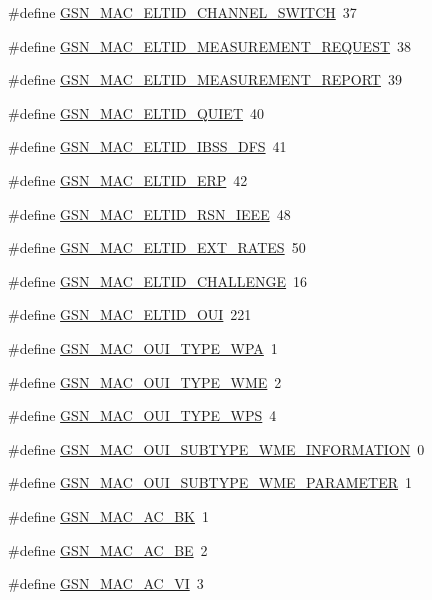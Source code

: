 \begin{DoxyCompactItemize}
\item 
\#define \hyperlink{a00523_aa9647b9b328ea5d3648960becda5d548}{GSN\_\-MAC\_\-ELTID\_\-CHANNEL\_\-SWITCH}~37
\item 
\#define \hyperlink{a00523_a74206ded393143ed4a945c22124274c4}{GSN\_\-MAC\_\-ELTID\_\-MEASUREMENT\_\-REQUEST}~38
\item 
\#define \hyperlink{a00523_a8b1f0cce85abeddecd5a4789a7be5877}{GSN\_\-MAC\_\-ELTID\_\-MEASUREMENT\_\-REPORT}~39
\item 
\#define \hyperlink{a00523_ab483b87fc0080afaa038193e398c22eb}{GSN\_\-MAC\_\-ELTID\_\-QUIET}~40
\item 
\#define \hyperlink{a00523_a4d517bf86f17132796f81d534812dfc3}{GSN\_\-MAC\_\-ELTID\_\-IBSS\_\-DFS}~41
\item 
\#define \hyperlink{a00523_a3f4d39075c8372bd6e0f5cd0071b1f5d}{GSN\_\-MAC\_\-ELTID\_\-ERP}~42
\item 
\#define \hyperlink{a00523_ae13688c49759c46706b5d2c131a7337d}{GSN\_\-MAC\_\-ELTID\_\-RSN\_\-IEEE}~48
\item 
\#define \hyperlink{a00523_aeb35925f7906a350f79f167a80c5c322}{GSN\_\-MAC\_\-ELTID\_\-EXT\_\-RATES}~50
\item 
\#define \hyperlink{a00523_a9c9233f2e4a71bc0fe46b84b02789edf}{GSN\_\-MAC\_\-ELTID\_\-CHALLENGE}~16
\item 
\#define \hyperlink{a00523_a300e90e8001ce21c4acb3e48e37a6578}{GSN\_\-MAC\_\-ELTID\_\-OUI}~221
\item 
\#define \hyperlink{a00523_aca3cf8892fe1262f30879cec6e140564}{GSN\_\-MAC\_\-OUI\_\-TYPE\_\-WPA}~1
\item 
\#define \hyperlink{a00523_a66775dc97097a30522a6d176983df16b}{GSN\_\-MAC\_\-OUI\_\-TYPE\_\-WME}~2
\item 
\#define \hyperlink{a00523_a272d730c13aa3c144b02980adc31b742}{GSN\_\-MAC\_\-OUI\_\-TYPE\_\-WPS}~4
\item 
\#define \hyperlink{a00523_ac90483af09dd5d1d9bce83e8c4891fff}{GSN\_\-MAC\_\-OUI\_\-SUBTYPE\_\-WME\_\-INFORMATION}~0
\item 
\#define \hyperlink{a00523_ab04bdbd8836b8fab4d561f1b23f4257c}{GSN\_\-MAC\_\-OUI\_\-SUBTYPE\_\-WME\_\-PARAMETER}~1
\item 
\#define \hyperlink{a00523_a540081039d0bce9eeac4a707840a0d87}{GSN\_\-MAC\_\-AC\_\-BK}~1
\item 
\#define \hyperlink{a00523_a231bc7c7b58a9acfdd495ab705397bbc}{GSN\_\-MAC\_\-AC\_\-BE}~2
\item 
\#define \hyperlink{a00523_a775e02e6af349e7e9e68c9ecd31b0ced}{GSN\_\-MAC\_\-AC\_\-VI}~3

\end{DoxyCompactItemize}
